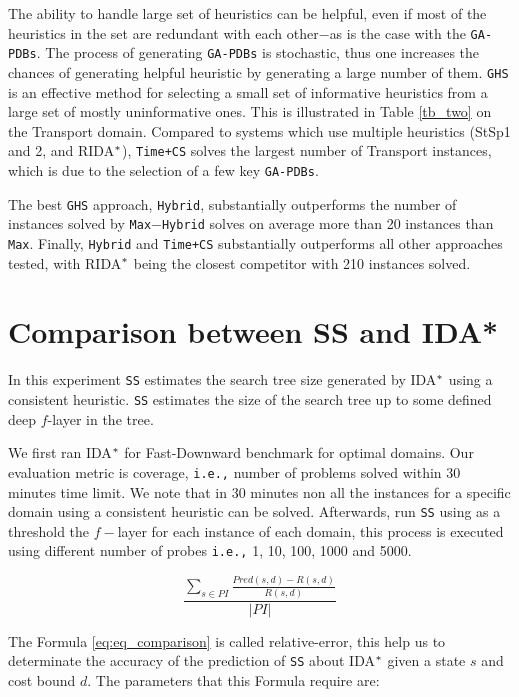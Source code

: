 The ability to handle large set of heuristics can be helpful, even if most of the heuristics in the set are redundant with each other$-$as is the case with the \texttt{GA-PDBs}. The process of generating \texttt{GA-PDBs} is stochastic, thus one increases the chances of generating helpful heuristic by generating a large number of them. \texttt{GHS} is an effective method for selecting a small set of informative heuristics from a large set of mostly uninformative ones. This is illustrated in Table \ref{tb_two} on the Transport domain. Compared to systems which use multiple heuristics (StSp1 and 2, and RIDA$\sp{*}$), \texttt{Time+CS} solves the largest number of Transport instances, which is due to the selection of a few key \texttt{GA-PDBs}.

The best \texttt{GHS} approach, \texttt{Hybrid}, substantially outperforms the number of instances solved by \texttt{Max$-$Hybrid} solves on average more than 20 instances than \texttt{Max}. Finally, \texttt{Hybrid} and \texttt{Time+CS} substantially outperforms all other approaches tested, with RIDA$\sp{*}$ being the closest competitor with 210 instances solved.

\section{Comparison between SS and IDA*}
\noindent
In this experiment \texttt{SS} estimates the search tree size generated by IDA$\sp{*}$ using a consistent heuristic. \texttt{SS} estimates the size of the search tree up to some defined deep $f$-layer in the tree.

We first ran IDA$\sp{*}$ for Fast-Downward benchmark for optimal domains. Our evaluation metric is coverage, \texttt{i.e.,} number of problems solved within 30 minutes time limit. We note that in 30 minutes non all the instances for a specific domain using a consistent heuristic can be solved. Afterwards, run \texttt{SS} using as a threshold the $f-$layer for each instance of each domain, this process is executed using different number of probes \texttt{i.e.,} 1, 10, 100, 1000 and 5000.

\begin{equation}
\frac{\sum_{s\in PI} \frac{Pred(s, d) - R(s, d)}{R(s, d)}}{|PI|}
\label{eq:eq_comparison}
\end{equation}

The Formula \ref{eq:eq_comparison} is called relative-error, this help us to determinate the accuracy of the prediction of \texttt{SS} about IDA$\sp{*}$ given a state $s$ and cost bound $d$. The parameters that this Formula require are:

